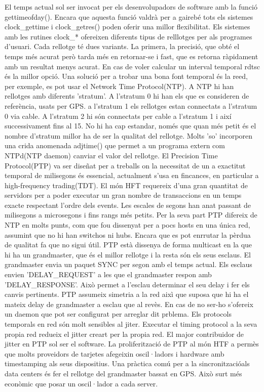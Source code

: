 \documentclass[a4paper, 10pt]{article}
\begin{document}
El temps actual sol ser invocat per els desenvolupadors de software amb la funció gettimeofday(). Encara que aquesta funció valdrà per a gairebé tots els sistemes clock_gettime i
clock_getres() poden oferir una millor flexibilitat. Els sistemes amb les rutines clock_* ofereixen diferents tipus de relllotges per als programes d'usuari. Cada rellotge té dues 
variants. La primera, la precisió,  que obté el temps més acurat però tarda més en retornar-se i fast, que es retorna ràpidament amb un resultat menys acurat. En cas de voler 
calcular un interval temporal rdtsc és la millor opció.
Una solució per a trobar una bona font temporal és la reed, per exemple, es pot usar el Network Time Protocol(NTP). A NTP hi han rellotges amb diferents 'stratum'. A l'stratum 0 hi han
els que es consideren de referència, usats per GPS. a l'stratum 1 els rellotges estan connectats a l'stratum 0 via cable. A l'stratum 2 hi són connectats per cable a l'stratum 1 i així successivament fins al 15.
No hi ha cap estandar, només que quan més petit és el nombre d'stratum millor ha de ser la qualitat del rellotge.
Molts 'so' incorporen una crida anomenada adjtime() que permet a un programa extern com NTPd(NTP daemon) canviar el valor del rellotge. 
El Precision Time Protocol(PTP) va ser diseñat per a treballs on la necessitat de un a exactitut temporal de milisegons és essencial, actualment s'usa en fincances, en particular  a high-frequency trading(TDT).
El món HFT requereix d'una gran quantitat de servidors per a poder executar un gran nombre de transaccions en un temps exacte respectant l'ordre dels events. Les escales de segons han anat passant
de milisegons a microsegons i fins rangs més petits.
Per la seva part PTP difereix de NTP en molts punts, com que fou dissenyat per a pocs hosts en una única red, assumint que no hi han switchos ni hubs. Encara que es pot enrrutar la pèrdua de 
qualitat fa que no sigui útil. PTP està dissenya de forma multicast en la que hi ha un grandmaster, que és el millor rellotge i la resta són els seus esclaus. El grandmaster envia un paquet SYNC per segon amb el temps actual.
Els esclaus envien 'DELAY_REQUEST' a les que el grandmaster respon amb 'DELAY_RESPONSE'. Això permet a l'esclau determinar el seu delay i fer els canvis pertinents.
PTP assumeix simetria a la red aixì que suposa que hi ha el mateix delay de grandmaster a esclau que al revès. En cas de no ser-ho s'ofereix un daemon que pot ser configurat per arreglar dit prblema.
Els protocols temporals en red són molt sensibles al jiter. Executar el timing protocol a la seva propia red redueix el jitter creart per la propia red. El major contribuidor de jitter en PTP sol
ser el software. La proliferització de PTP al món HTF a permès que molts proveidors de tarjetes afegeixin oscil·ladors i hardware amb timestamping als seus dispositius.
Una pràctica comú per a la sincronitzacióals data centers és fer el rellotge del grandmaster bassat en GPS. Això surt més econòmic que posar un oscil·lador a cada server.
\end{document}
